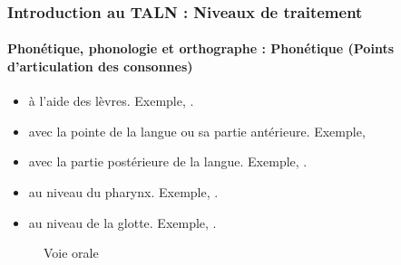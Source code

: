 \documentclass[xcolor=table]{beamer}
\begin{document}
\begin{frame}
\frametitle{Introduction au TALN : Niveaux de traitement}
\framesubtitle{Phonétique, phonologie et orthographe : Phonétique (Points d'articulation des consonnes)}
\begin{minipage}{0.5\textwidth}
\begin{itemize}
	\item {} à l'aide des lèvres. Exemple, \expword{\textipa{[b], [p], [m], [f], [v]}}.
	\item {} avec la pointe de la langue ou sa partie antérieure. 
	Exemple, 
	\item {} avec la partie postérieure de la langue. Exemple, .
	\item {} au niveau du pharynx. 
	Exemple, .
	\item {} au niveau de la glotte. 
	Exemple, .
\end{itemize}
\end{minipage}
\begin{minipage}{0.48\textwidth}
	\begin{figure}
		\caption{Voie orale \cite{2009-ball}}
	\end{figure}
\end{minipage}

\end{frame}
\end{document}
